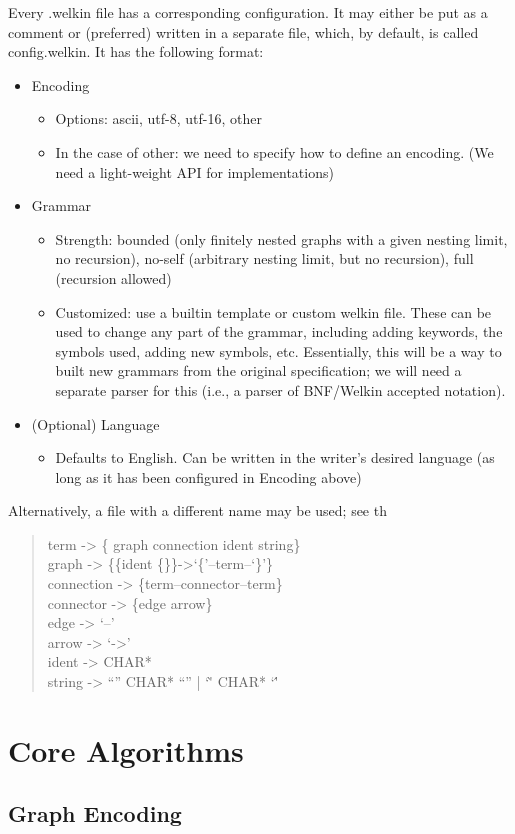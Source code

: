 Every .welkin file has a corresponding configuration. It may either be put as a comment or (preferred) written in a separate file, which, by default, is called config.welkin. It has the following format:
\begin{itemize}
	\item Encoding
				\begin{itemize}
					\item Options: ascii, utf-8, utf-16, other
					\item In the case of other: we need to specify how to define an encoding. (We need a light-weight API for implementations)
				\end{itemize}
	\item Grammar
				\begin{itemize}
					\item Strength: bounded (only finitely nested graphs with a given nesting limit, no recursion), no-self (arbitrary nesting limit, but no recursion), full (recursion allowed)
					\item Customized: use a builtin template or custom welkin file. These can be used to change any part of the grammar, including adding keywords, the symbols used, adding new symbols, etc. Essentially, this will be a way to built new grammars from the original specification; we will need a separate parser for this (i.e., a parser of BNF/Welkin accepted notation).
				\end{itemize}

	\item (Optional) Language
				\begin{itemize}
					\item Defaults to English. Can be written in the writer's desired language (as long as it has been configured in Encoding above)
				\end{itemize}
\end{itemize}

Alternatively, a file with a different name may be used; see th


\begin{quote}{\ttfamily \raggedright \noindent
	term -> \{ graph connection ident string\}\\
	graph -> \{\{ident \{\}\}->`\{'--term--`\}'\}\\
	connection -> \{term--connector--term\}\\
	connector -> \{edge arrow\}\\
	edge -> `--'\\
	arrow -> `->'\\
	ident -> CHAR*\\
	string -> ``'' CHAR* ``'' | `\`' CHAR* `\''
}\end{quote}

\section{Core Algorithms}

\subsection{Graph Encoding}



\label{ch:spec}
